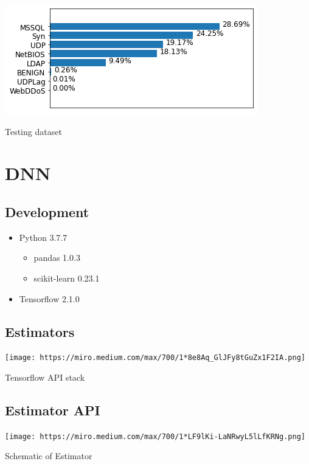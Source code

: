 \documentclass[11pt]{article}
\begin{document}
\begin{center}
\includegraphics[width=.9\linewidth]{./img/test_ds.png}
\end{center}
Testing dataset

\section*{DNN}
\label{sec:org874ed4c}
\subsection*{Development}
\label{sec:orgf16a172}
\begin{itemize}
\item Python 3.7.7
\begin{itemize}
\item pandas 1.0.3
\item scikit-learn 0.23.1
\end{itemize}
\item Tensorflow 2.1.0
\end{itemize}
\subsection*{Estimators}
\label{sec:orgbe634ca}
\begin{center}
\texttt{[image: https://miro.medium.com/max/700/1*8e8Aq\_GlJFy8tGuZx1F2IA.png]}
\end{center}

Tensorflow API stack
\subsection*{Estimator API}
\label{sec:org5b9a733}
\begin{center}
\texttt{[image: https://miro.medium.com/max/700/1*LF9lKi-LaNRwyL5lLfKRNg.png]}
\end{center}

Schematic of Estimator
\end{document}
